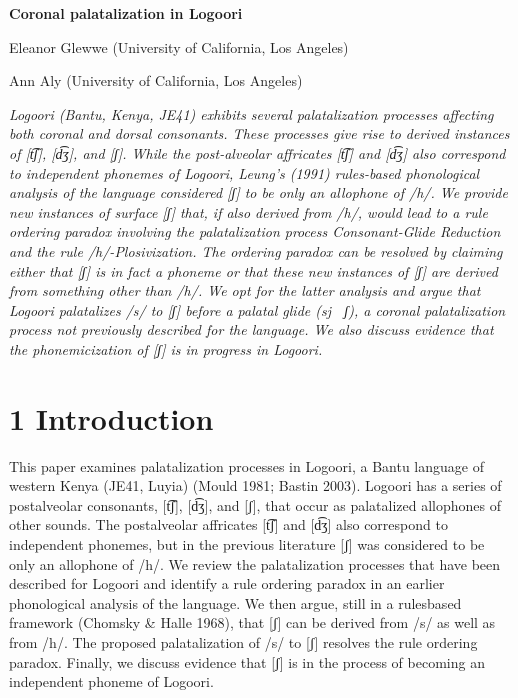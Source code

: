 

\setcounter{page}{1}
\textbf{Coronal palatalization in Logoori}

Eleanor Glewwe (University of California, Los Angeles)

Ann Aly (University of California, Los Angeles) 

\textit{Logoori (Bantu, Kenya, JE41) exhibits several palatalization processes affecting both coronal and dorsal consonants. These processes give rise to derived instances of [t͡ʃ], [d͡ʒ], and [ʃ]. While the post-alveolar affricates [t͡ʃ] and [d͡ʒ]  also correspond to independent phonemes of Logoori, Leung’s (1991) rules-based phonological analysis of the language considered [ʃ] to be only an allophone of /h/. We provide new instances of surface [ʃ] that, if also derived from /h/, would lead to a rule ordering paradox involving the palatalization process Consonant-Glide Reduction and the rule /h/-Plosivization. The ordering paradox can be resolved by claiming either that [ʃ] is in fact a phoneme or that these new instances of [ʃ] are derived from something other than /h/. We opt for the latter analysis and argue that Logoori palatalizes /s/ to [ʃ] before a palatal glide (sj }\textit{ ʃ), a coronal palatalization process not previously described for the language. We also discuss evidence that the phonemicization of [ʃ] is in progress in Logoori.   }

\chapter[1 Introduction]{1 Introduction}

This paper examines palatalization processes in Logoori, a Bantu language of western Kenya (JE41, Luyia) (Mould 1981; Bastin 2003). Logoori has a series of postalveolar consonants, [t͡ʃ], [d͡ʒ], and [ʃ], that occur as palatalized allophones of other sounds. The postalveolar affricates [t͡ʃ] and [d͡ʒ] also correspond to independent phonemes, but in the previous literature [ʃ] was considered to be only an allophone of /h/. We review the palatalization processes that have been described for Logoori and identify a rule ordering paradox in an earlier phonological analysis of the language. We then argue, still in a rulesbased framework (Chomsky \& Halle 1968), that [ʃ] can be derived from /s/ as well as from /h/. The proposed palatalization of /s/ to [ʃ] resolves the rule ordering paradox. Finally, we discuss evidence that [ʃ] is in the process of becoming an independent phoneme of Logoori.


